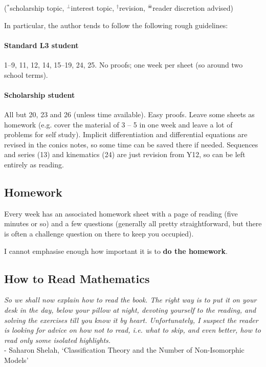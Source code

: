 ($^*$scholarship topic, $^\perp$interest topic, $^\dagger$revision, $^\skull$reader discretion advised)

In particular, the author tends to follow the following rough guidelines:

\paragraph{Standard L3 student}
1--9, 11, 12, 14, 15--19, 24, 25. No proofs; one week per sheet (so around two school terms).

\paragraph{Scholarship student}
All but 20, 23 and 26 (unless time available). Easy proofs. Leave some sheets as homework (e.g. cover the material of 3 -- 5 in one week and
leave a lot of problems for self study). Implicit differentiation and differential equations are revised in the conics notes, so some time
can be saved there if needed. Sequences and series (13) and kinematics (24) are just revision from Y12, so can be left entirely as reading.

\subsection*{Homework}
Every week has an associated homework sheet with a page of reading (five minutes or so) and a few questions (generally all
pretty straightforward, but there is often a challenge question on there to keep you occupied).

I cannot emphasise enough how important it is to \textbf{do the homework}.

\subsection*{How to Read Mathematics}
\begin{center}
  \textit{So we shall now explain how to read the book. The right way is to put it on your desk in the day, below your pillow at night, devoting yourself to the reading, and solving the exercises till you know it by heart. Unfortunately, I suspect the reader is looking for advice on how not to read, i.e. what to skip, and even better, how to read only some isolated highlights.}\\ - Saharon Shelah, `Classification Theory and the Number of Non-Isomorphic Models'
\end{center}

